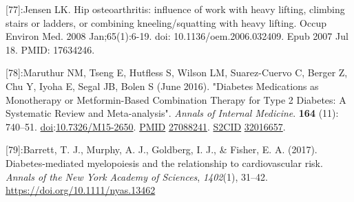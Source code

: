 \documentclass[
]{article}
\begin{document}
{[}77{]}:Jensen LK. Hip osteoarthritis: influence of work with heavy
lifting, climbing stairs or ladders, or combining kneeling/squatting
with heavy lifting. Occup Environ Med. 2008 Jan;65(1):6-19. doi:
10.1136/oem.2006.032409. Epub 2007 Jul 18. PMID: 17634246.

{[}78{]}:Maruthur NM, Tseng E, Hutfless S, Wilson LM, Suarez-Cuervo C,
Berger Z, Chu Y, Iyoha E, Segal JB, Bolen S (June 2016). "Diabetes
Medications as Monotherapy or Metformin-Based Combination Therapy for
Type 2 Diabetes: A Systematic Review and Meta-analysis". \emph{Annals of
Internal Medicine}. \textbf{164} (11): 740--51.
\href{https://en.wikipedia.org/wiki/Doi_(identifier)}{doi}:\href{https://doi.org/10.7326\%2FM15-2650}{10.7326/M15-2650}.
\href{https://en.wikipedia.org/wiki/PMID_(identifier)}{PMID}
\href{https://pubmed.ncbi.nlm.nih.gov/27088241}{27088241}.
\href{https://en.wikipedia.org/wiki/S2CID_(identifier)}{S2CID}
\href{https://api.semanticscholar.org/CorpusID:32016657}{32016657}.

{[}79{]}:Barrett, T. J., Murphy, A. J., Goldberg, I. J., \& Fisher, E.
A. (2017). Diabetes-mediated myelopoiesis and the relationship to
cardiovascular risk. \emph{Annals of the New York Academy of Sciences},
\emph{1402}(1), 31--42. \url{https://doi.org/10.1111/nyas.13462}
\end{document}
